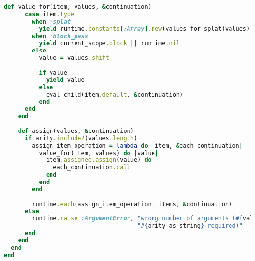 \begin{lstlisting}[title={\small\Helvetica ast/scopes.rb},language=Ruby]
    def value_for(item, values, &continuation)
      case item.type
        when :splat
          yield runtime.constants[:Array].new(values_for_splat(values))
        when :block_pass
          yield current_scope.block || runtime.nil
        else
          value = values.shift
          
          if value
            yield value
          else
            eval_child(item.default, &continuation)
          end
      end
    end
    
    def assign(values, &continuation)
      if arity.include?(values.length)
        assign_item_operation = lambda do |item, &each_continuation|
          value_for(item, values) do |value|
            item.assignee.assign(value) do
              each_continuation.call
            end
          end
        end
        
        runtime.each(assign_item_operation, items, &continuation)
      else
        runtime.raise :ArgumentError, "wrong number of arguments (#{values.length} supplied, " +
                                      "#{arity_as_string} required)"
      end
    end
  end
end

\end{lstlisting}
